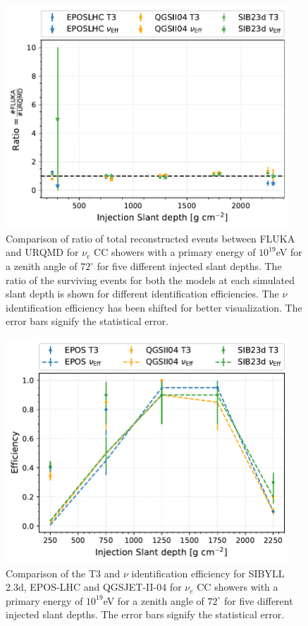 \begin{figure}[t!]
  \centering
  \includegraphics[width=0.95\textwidth]{thesis_figures/App2/Efficiency_vs_slant_comp_FLUKAnURQMD.pdf}
  \caption{Comparison of ratio of total reconstructed events between FLUKA and URQMD for $\nu_e$ CC showers with a primary energy of $10^{19}$eV for a zenith angle of $72^\circ$ for five different injected slant depths. The ratio of the surviving events for both the models at each simulated slant depth is shown for different identification efficiencies. The $\nu$ identification efficiency has been shifted for better visualization. The error bars signify the statistical error.}
  \label{fig:Efficiency_vs_slant_comp_FLUKAnURQMD}
\end{figure}

\begin{figure}[h!]
  \centering
  \includegraphics[width=0.95\textwidth]{thesis_figures/App2/Efficiency_vs_slant_comp_all_HModel.pdf}
  \caption{Comparison of the T3 and $\nu$ identification efficiency for SIBYLL 2.3d, EPOS-LHC and QGSJET-II-04 for $\nu_e$ CC showers with a primary energy of $10^{19}$eV for a zenith angle of $72^\circ$ for five different injected slant depths. The error bars signify the statistical error.}
  \label{fig:Eff_vs_slant_comp_all_HModels}
\end{figure}


